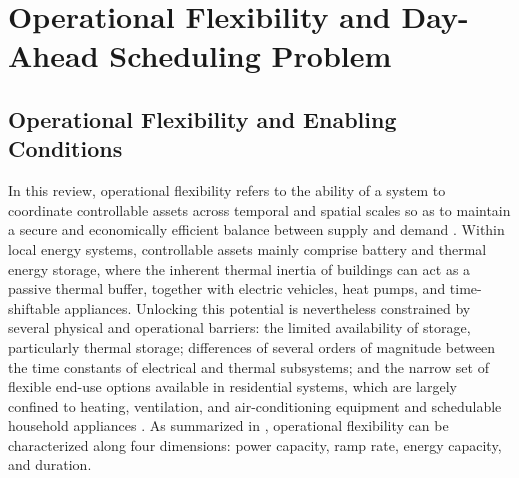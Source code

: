 \documentclass[conference]{IEEEtran}
\begin{document}
\section{Operational Flexibility and Day-Ahead Scheduling Problem}

\subsection{Operational Flexibility and Enabling Conditions}
In this review, operational flexibility refers to the ability of a system to coordinate controllable assets across temporal and spatial scales so as to maintain a secure and economically efficient balance between supply and demand \cite{DallAnese2017}. Within local energy systems, controllable assets mainly comprise battery and thermal energy storage, where the inherent thermal inertia of buildings can act as a passive thermal buffer, together with electric vehicles, heat pumps, and time-shiftable appliances. Unlocking this potential is nevertheless constrained by several physical and operational barriers: the limited availability of storage, particularly thermal storage; differences of several orders of magnitude between the time constants of electrical and thermal subsystems; and the narrow set of flexible end-use options available in residential systems, which are largely confined to heating, ventilation, and air-conditioning equipment and schedulable household appliances \cite{DallAnese2017}. As summarized in \cite{Diekerhof2018}, operational flexibility can be characterized along four dimensions: power capacity, ramp rate, energy capacity, and duration.
\end{document}
